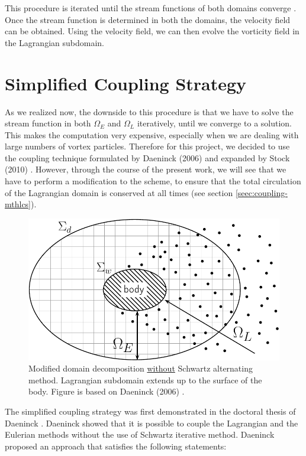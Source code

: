 	This procedure is iterated until the stream functions of both domains converge \cite{Ould-Salihi2001a}. Once the stream function is determined in both the domains, the velocity field can be obtained. Using the velocity field, we can then evolve the vorticity field in the Lagrangian subdomain.

	\section{Simplified Coupling Strategy}
	\label{sec:helvpm-scs}
	
	As we realized now, the downside to this procedure is that we have to solve the stream function in both $\Omega_E$ and $\Omega_L$ iteratively, until we converge to a solution. This makes the computation very expensive, especially when we are dealing with large numbers of vortex particles. Therefore for this project, we decided to use the coupling technique formulated by Daeninck (2006) \cite{Daeninck2006} and expanded by Stock (2010) \cite{Stock2010a}. However, through the course of the present work, we will see that we have to perform a modification to the scheme, to ensure that the total circulation of the Lagrangian domain is conserved at all times (see section \ref{seec:coupling-mthlcs}).	
	

		\begin{figure}[!t]
			\centering
			\includegraphics[width=0.6\linewidth]{figures/hybrid/domainDecomposition_daenick_type2-crop.pdf}
			\caption{Modified domain decomposition \underline{without} Schwartz alternating method. Lagrangian subdomain extends up to the surface of the body. Figure is based on Daeninck (2006) \cite{Daeninck2006}.}
			\label{fig:domainDecomposition_daenick}
		\end{figure}
	
	The simplified coupling strategy was first demonstrated in the doctoral thesis of Daeninck \cite{Daeninck2006}. Daeninck showed that it is possible to couple the Lagrangian and the Eulerian methods without the use of Schwartz iterative method. Daeninck proposed an approach that satisfies the following statements:
	
